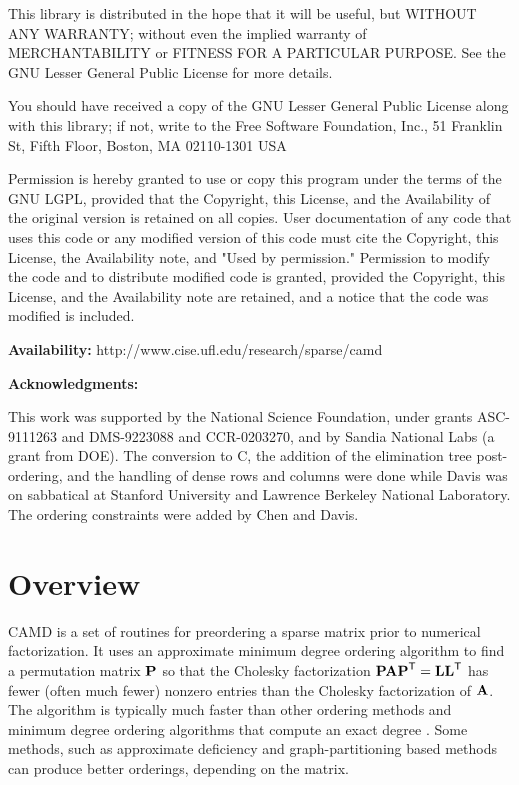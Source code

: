 \documentclass[11pt]{article}
\newcommand{\m}[1]{{\bf{#1}}}       %
\newcommand{\tr}{^{\sf T}}          %
\begin{document}
    This library is distributed in the hope that it will be useful,
    but WITHOUT ANY WARRANTY; without even the implied warranty of
    MERCHANTABILITY or FITNESS FOR A PARTICULAR PURPOSE.  See the GNU
    Lesser General Public License for more details.

    You should have received a copy of the GNU Lesser General Public
    License along with this library; if not, write to the Free Software
    Foundation, Inc., 51 Franklin St, Fifth Floor, Boston, MA  02110-1301
    USA

    Permission is hereby granted to use or copy this program under the
    terms of the GNU LGPL, provided that the Copyright, this License,
    and the Availability of the original version is retained on all copies.
    User documentation of any code that uses this code or any modified
    version of this code must cite the Copyright, this License, the
    Availability note, and "Used by permission." Permission to modify
    the code and to distribute modified code is granted, provided the
    Copyright, this License, and the Availability note are retained,
    and a notice that the code was modified is included.

{\bf Availability:}
    http://www.cise.ufl.edu/research/sparse/camd

{\bf Acknowledgments:}

    This work was supported by the National Science Foundation, under
    grants ASC-9111263 and DMS-9223088 and CCR-0203270, and by Sandia
    National Labs (a grant from DOE).
    The conversion to C, the addition of the elimination tree
    post-ordering, and the handling of dense rows and columns
    were done while Davis was on sabbatical at
    Stanford University and Lawrence Berkeley National Laboratory.
    The ordering constraints were added by Chen and Davis.

\newpage
\section{Overview}

CAMD is a set of routines for preordering a sparse matrix prior to
numerical factorization.  It uses an approximate minimum degree ordering
algorithm \cite{AmestoyDavisDuff96,AmestoyDavisDuff04}
to find a permutation matrix $\m{P}$
so that the Cholesky factorization $\m{PAP}\tr=\m{LL}\tr$ has fewer
(often much fewer) nonzero entries than the Cholesky factorization of $\m{A}$.
The algorithm is typically much faster than other ordering methods
and  minimum degree ordering
algorithms that compute an exact degree \cite{GeorgeLiu89}.
Some methods, such as approximate deficiency
\cite{RothbergEisenstat98} and graph-partitioning based methods
\cite{Chaco,KarypisKumar98e,PellegriniRomanAmestoy00,schu:01}
can produce better orderings, depending on the matrix.
\end{document}
